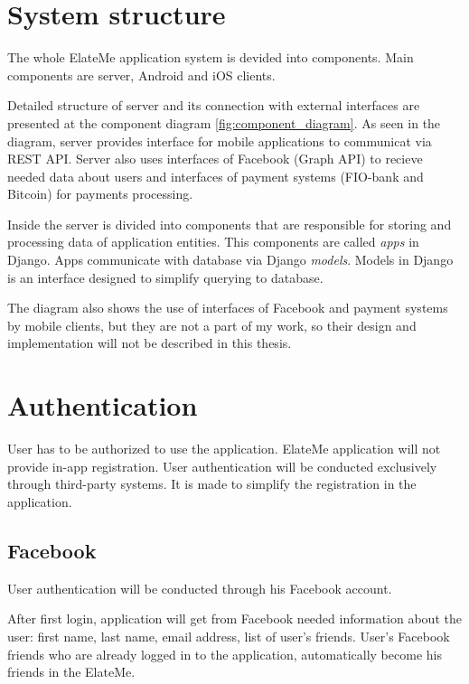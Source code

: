 


\section{System structure}
The whole ElateMe application system is devided into components. Main components are server, Android and iOS clients.

Detailed structure of server and its connection with external interfaces are presented at the component diagram
\ref{fig:component_diagram}. As seen in the diagram, server provides interface for mobile applications to communicat via
REST API. Server also uses interfaces of Facebook (Graph API) to recieve needed data about users and interfaces of
payment systems (FIO-bank and Bitcoin) for payments processing.

Inside the server is divided into components that are responsible for storing and processing data of application
entities. This components are called \textit{apps} in Django. Apps communicate with database via Django \textit{models}.
Models in Django is an interface designed to simplify querying to database.


The diagram also shows the use of interfaces of Facebook and payment systems by mobile clients, but they are not a part
of my work, so their design and implementation will not be described in this thesis.



\section{Authentication}
User has to be authorized to use the application. ElateMe application will not provide in-app registration. User
authentication will be conducted exclusively through third-party systems. It is made to simplify the registration in
the application.


\subsection{Facebook}
User authentication will be conducted through his Facebook account.

After first login, application will get from Facebook needed information about the user: first name, last name,
email address, list of user's friends. User's Facebook friends who are already logged in to the application,
automatically become his friends in the ElateMe.

